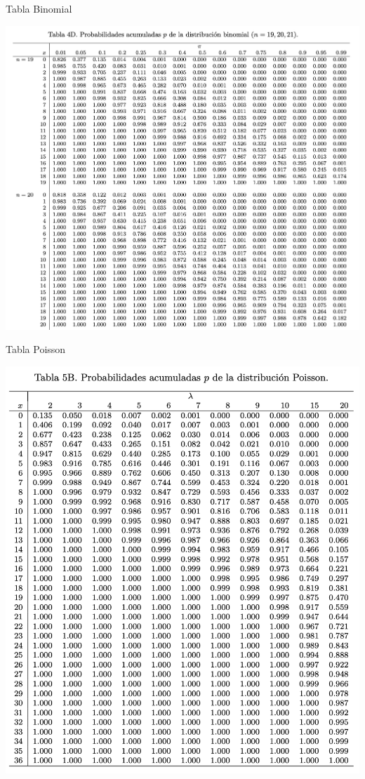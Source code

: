 \documentclass[addpoints]{exam}
\theoremstyle{mytheor}
\begin{document}
\begin{questions}
\newpage

Tabla Binomial

\includegraphics[width=15cm]{tabla_binomial.png}

\newpage
Tabla Poisson

\includegraphics[width=15cm]{tabla_poisson.png}


\end{questions}
\end{document}
